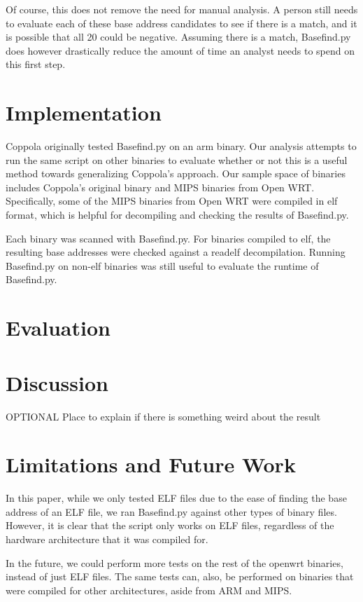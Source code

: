 \documentclass[letterpaper,twocolumn,10pt]{article}
\begin{document}
Of course, this does not remove the need for manual analysis. A person still needs to evaluate each of these base address candidates to see if there is a match, and it is possible that all 20 could be negative. Assuming there is a match, Basefind.py does however drastically reduce the amount of time an analyst needs to spend on this first step. 

\section{Implementation}
Coppola\cite{cloudscale2013} originally tested Basefind.py on an arm binary. Our analysis attempts to run the same script on other binaries to evaluate whether or not this is a useful method towards generalizing Coppola's approach. Our sample space of binaries includes Coppola's original binary and MIPS binaries from Open WRT. Specifically, some of the MIPS binaries from Open WRT were compiled in elf format, which is helpful for decompiling and checking the results of Basefind.py.

Each binary was scanned with Basefind.py. For binaries compiled to elf, the resulting base addresses were checked against a readelf decompilation. Running Basefind.py on non-elf binaries was still useful to evaluate the runtime of Basefind.py.

\section{Evaluation}

\section{Discussion}
OPTIONAL
Place to explain if there is something weird about the result

\section{Limitations and Future Work}
In this paper, while we only tested ELF files due to the ease of finding the base address of an ELF file, we ran Basefind.py against other types of binary files. However, it is clear that the script only works on ELF files, regardless of the hardware architecture that it was compiled for. 

In the future, we could perform more tests on the rest of the openwrt binaries, instead of just ELF files. The same tests can, also, be performed on binaries that were compiled for other architectures, aside from ARM and MIPS. 
\end{document}
